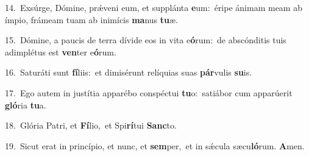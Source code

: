 {\numbfont\textcolor{\numbcolor}{14.}}~Exsúrge, Dómine, prǽveni eum, et supplánta \textbf{e}\-um:~\star éripe ánimam meam ab ímpio, frámeam tuam ab inimícis \textbf{ma}\-nus \textbf{tu}\-æ.\par
{\numbfont\textcolor{\numbcolor}{15.}}~Dómine, a paucis de terra dívide eos in vita e\-\textbf{ó}\-rum:~\star de abscónditis tuis adimplétus est \textbf{ven}\-ter e\-\textbf{ó}\-rum.\par
{\numbfont\textcolor{\numbcolor}{16.}}~Saturáti sunt \textbf{fí}\-liis:~\star et dimisérunt relíquias suas \textbf{pár}\-vulis \textbf{su}\-is.\par
{\numbfont\textcolor{\numbcolor}{17.}}~Ego autem in justítia apparébo conspéctui \textbf{tu}\-o:~\star satiábor cum apparúerit \textbf{gló}\-ria \textbf{tu}\-a.\par
{\numbfont\textcolor{\numbcolor}{18.}}~Glória Patri, et \textbf{Fí}\-lio,~\star et Spi\-\textbf{rí}\-tui \textbf{Sanc}\-to.\par
{\numbfont\textcolor{\numbcolor}{19.}}~Sicut erat in princípio, et nunc, et \textbf{sem}\-per,~\star et in sǽcula sæcu\-\textbf{ló}\-rum. \textbf{A}\-men.\par
